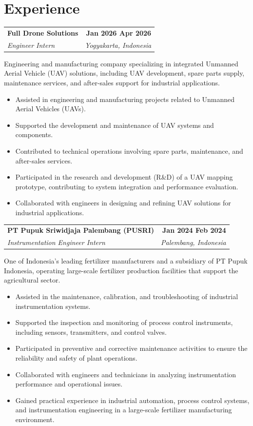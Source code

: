 \documentclass[a4paper,10pt]{article}
\makeatletter
\newcommand{\entry}[4]{%
  \begin{tabularx}{\linewidth}{@{}X r@{}}
    \textbf{#1} & \hspace{1em}\textbf{#4} \\
    \textit{#3} & \hspace{1em}\textit{\small #2} \\
  \end{tabularx}\par\vspace{1pt}%
}
\newcommand{\about}[1]{{\small\color{darkgray}#1}\par}
\newcommand{\entrygap}{\vspace{6pt}}
\makeatother
\begin{document}
\section{Experience}
\entry{Full Drone Solutions}{Yogyakarta, Indonesia}
      {Engineer Intern}{Jan 2026 \textendash{} Apr 2026}
\about{Engineering and manufacturing company specializing in integrated Unmanned
Aerial Vehicle (UAV) solutions, including UAV development, spare parts supply,
maintenance services, and after-sales support for industrial applications.}
\begin{itemize}
  \item Assisted in engineering and manufacturing projects related to Unmanned Aerial Vehicles (UAVs).
  \item Supported the development and maintenance of UAV systems and components.
  \item Contributed to technical operations involving spare parts, maintenance, and after-sales services.
  \item Participated in the research and development (R\&D) of a UAV mapping prototype, contributing to system integration and performance evaluation.
  \item Collaborated with engineers in designing and refining UAV solutions for industrial applications.
\end{itemize}
\entrygap

\entry{PT Pupuk Sriwidjaja Palembang (PUSRI)}{Palembang, Indonesia}
      {Instrumentation Engineer Intern}{Jan 2024 \textendash{} Feb 2024}
\about{One of Indonesia's leading fertilizer manufacturers and a subsidiary of
PT Pupuk Indonesia, operating large-scale fertilizer production facilities that
support the agricultural sector.}
\begin{itemize}
  \item Assisted in the maintenance, calibration, and troubleshooting of industrial instrumentation systems.
  \item Supported the inspection and monitoring of process control instruments, including sensors, transmitters, and control valves.
  \item Participated in preventive and corrective maintenance activities to ensure the reliability and safety of plant operations.
  \item Collaborated with engineers and technicians in analyzing instrumentation performance and operational issues.
  \item Gained practical experience in industrial automation, process control systems, and instrumentation engineering in a large-scale fertilizer manufacturing environment.
\end{itemize}
\end{document}
